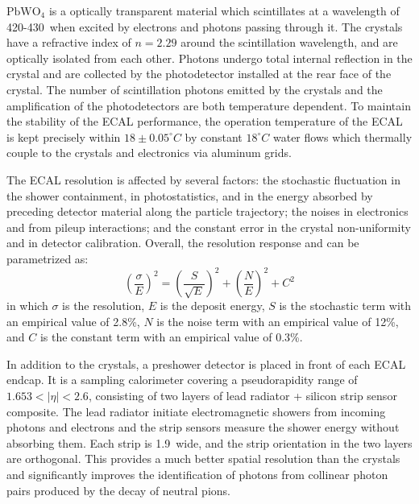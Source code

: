 $\text{PbWO}_{4}$ is a optically transparent material which scintillates at a wavelength of 420-430~\nm when excited by electrons and photons passing through it.
The crystals have a refractive index of $n = 2.29$ around the scintillation wavelength, and are optically isolated from each other.
Photons undergo total internal reflection in the crystal and are collected by the photodetector installed at the rear face of the crystal.  
The number of scintillation photons emitted by the crystals and the amplification of the photodetectors are both temperature dependent.
To maintain the stability of the ECAL performance, the operation temperature of the ECAL is kept precisely within $18 \pm 0.05^{\circ}C$
by constant $18^{\circ}C$ water flows which thermally couple to the crystals and electronics via aluminum grids.

The ECAL resolution is affected by several factors: 
the stochastic fluctuation in the shower containment, in photostatistics, and in the energy absorbed by preceding detector material along the particle trajectory; 
the noises in electronics and from pileup interactions;
and the constant error in the crystal non-uniformity and in detector calibration.
Overall, the resolution response and can be parametrized as:
\begin{equation}\label{eq:ecal_reso}
    ( \frac{\sigma}{E} )^{2} = ( \frac{S}{\sqrt{E}} )^{2} + ( \frac{N}{E} )^{2} + C^{2}
\end{equation}
in which $\sigma$ is the resolution, $E$ is the deposit energy,
$S$ is the stochastic term with an empirical value of 2.8\%, 
$N$ is the noise term with an empirical value of 12\%,
and $C$ is the constant term with an empirical value of 0.3\%.

In addition to the crystals, a preshower detector is placed in front of each ECAL endcap. 
It is a sampling calorimeter covering a pseudorapidity range of $1.653 < |\eta| < 2.6$, 
consisting of two layers of lead radiator + silicon strip sensor composite. 
The lead radiator initiate electromagnetic showers from incoming photons and electrons and the strip sensors measure the shower energy without absorbing them.
Each strip is 1.9~\mm wide, and the strip orientation in the two layers are orthogonal.
This provides a much better spatial resolution than the crystals and significantly improves the 
identification of photons from collinear photon pairs produced by the decay of neutral pions.


